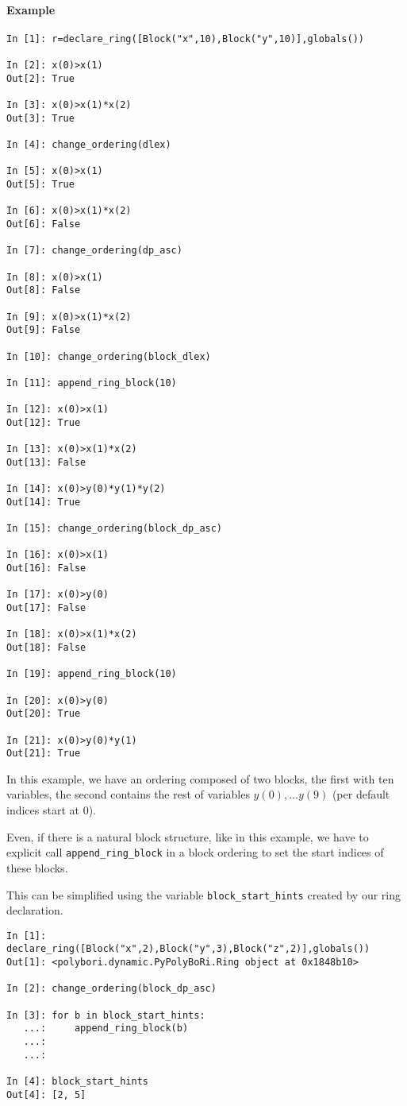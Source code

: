 \documentclass[]{article}
\begin{document}
\paragraph{Example}
\begin{lstlisting}
In [1]: r=declare_ring([Block("x",10),Block("y",10)],globals())

In [2]: x(0)>x(1)
Out[2]: True

In [3]: x(0)>x(1)*x(2)
Out[3]: True

In [4]: change_ordering(dlex)

In [5]: x(0)>x(1)
Out[5]: True

In [6]: x(0)>x(1)*x(2)
Out[6]: False

In [7]: change_ordering(dp_asc)

In [8]: x(0)>x(1)
Out[8]: False

In [9]: x(0)>x(1)*x(2)
Out[9]: False

In [10]: change_ordering(block_dlex)

In [11]: append_ring_block(10)

In [12]: x(0)>x(1)
Out[12]: True

In [13]: x(0)>x(1)*x(2)
Out[13]: False

In [14]: x(0)>y(0)*y(1)*y(2)
Out[14]: True

In [15]: change_ordering(block_dp_asc)

In [16]: x(0)>x(1)
Out[16]: False

In [17]: x(0)>y(0)
Out[17]: False

In [18]: x(0)>x(1)*x(2)
Out[18]: False

In [19]: append_ring_block(10)

In [20]: x(0)>y(0)
Out[20]: True

In [21]: x(0)>y(0)*y(1)
Out[21]: True
\end{lstlisting}
In this example, we have an ordering composed of two blocks, the first with ten variables, the second contains the rest of variables $y(0), \ldots y(9)$ (per default indices start at 0).

Even, if there is a natural block structure, like in this example, we have to explicit call \lstinline|append_ring_block| in a block ordering to set the start indices of these blocks.

This can be simplified using the variable \lstinline|block_start_hints| created by our ring declaration.

\begin{lstlisting}
In [1]: declare_ring([Block("x",2),Block("y",3),Block("z",2)],globals())
Out[1]: <polybori.dynamic.PyPolyBoRi.Ring object at 0x1848b10>

In [2]: change_ordering(block_dp_asc)

In [3]: for b in block_start_hints:
   ...:     append_ring_block(b)
   ...:     
   ...:     

In [4]: block_start_hints
Out[4]: [2, 5]
\end{lstlisting}
\end{document}
